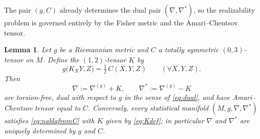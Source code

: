 \documentclass{amsart}
\newtheorem{lemma}{Lemma}
\theoremstyle{definition}
\theoremstyle{remark}
\begin{document}
The pair $(g,C)$ already determines the dual pair $(\nabla,\nabla^{*})$, so the
realizability problem is governed entirely by the Fisher metric and the
Amari--Chentsov tensor.

\begin{lemma}\label{lem:reduce}
Let $g$ be a Riemannian metric and $C$ a totally symmetric $(0,3)$-tensor on $M$.
Define the $(1,2)$-tensor $K$ by
\begin{equation}\label{eq:Kdef}
  g\bigl(K_{X}Y,Z\bigr)=\tfrac12\,C(X,Y,Z)\qquad(\forall X,Y,Z).
\end{equation}
Then
\begin{equation}\label{eq:nablafromC}
  \nabla:=\nabla^{(g)}+K,\qquad \nabla^{*}:=\nabla^{(g)}-K
\end{equation}
are torsion-free, dual with respect to $g$ in the sense of \eqref{eq:dual}, and
have Amari--Chentsov tensor equal to $C$. Conversely, every statistical manifold
$(M,g,\nabla,\nabla^{*})$ satisfies \eqref{eq:nablafromC} with $K$ given by
\eqref{eq:Kdef}; in particular $\nabla$ and $\nabla^{*}$ are uniquely determined
by $g$ and $C$.
\end{lemma}
\end{document}
